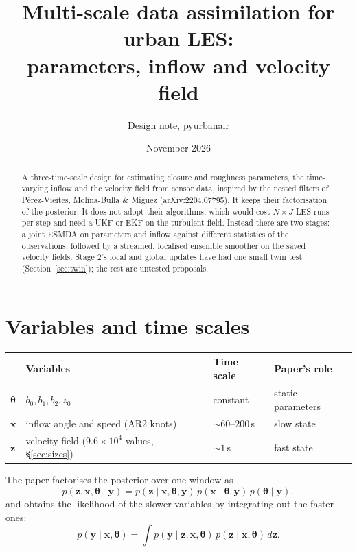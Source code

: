 \documentclass[11pt,a4paper]{article}
\title{Multi-scale data assimilation for urban LES:\\
parameters, inflow and velocity field}
\author{Design note, pyurbanair}
\date{November 2026}
\begin{document}
\maketitle

\begin{abstract}
A three-time-scale design for estimating closure and roughness parameters, the
time-varying inflow and the velocity field from sensor data, inspired by the
nested filters of P\'erez-Vieites, Molina-Bulla \& M\'iguez (arXiv:2204.07795).
It keeps their factorisation of the posterior. It does not adopt their
algorithms, which would cost $N \times J$ LES runs per step and need a UKF or
EKF on the turbulent field. Instead there are two stages: a joint ESMDA on
parameters and inflow against different statistics of the observations,
followed by a streamed, localised ensemble smoother on the saved velocity
fields. Stage 2's local and global updates have had one small twin test
(Section~\ref{sec:twin}); the rest are untested proposals.
\end{abstract}

\section{Variables and time scales}

\begin{center}
\begin{tabular}{@{}llll@{}}
\toprule
 & Variables & Time scale & Paper's role \\
\midrule
$\bm\theta$ & $b_0, b_1, b_2, z_0$ & constant & static parameters \\
$\bm x$ & inflow angle and speed (AR2 knots) & $\sim 60$--$200$\,s & slow state \\
$\bm z$ & velocity field ($9.6\times10^4$ values, \S\ref{sec:sizes}) & $\sim 1$\,s & fast state \\
\bottomrule
\end{tabular}
\end{center}

\noindent The paper factorises the posterior over one window as
\begin{equation}
  p(\bm z, \bm x, \bm\theta \mid \bm y)
  = p(\bm z \mid \bm x, \bm\theta, \bm y)\,
    p(\bm x \mid \bm\theta, \bm y)\,
    p(\bm\theta \mid \bm y),
  \label{eq:factor}
\end{equation}
and obtains the likelihood of the slower variables by integrating out the
faster ones:
\begin{equation}
  p(\bm y \mid \bm x, \bm\theta)
  = \int p(\bm y \mid \bm z, \bm x, \bm\theta)\,
         p(\bm z \mid \bm x, \bm\theta)\, d\bm z .
  \label{eq:marginal}
\end{equation}
\end{document}
